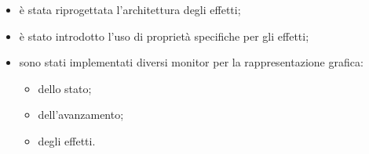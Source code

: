 \documentclass[%
]{beamer}
\begin{document}
            \begin{frame}
                \frametitle{\insertsection}
                \framesubtitle{\insertsubsection}
                \begin{columns}[onlytextwidth]
                    \begin{column}{.4\textwidth}
                    \begin{itemize}
                        \item<1->
                            è stata riprogettata l'architettura degli effetti;
                        \item<2->
                            è stato introdotto l'uso di proprietà specifiche per gli effetti;
                        \item<3->
                            sono stati implementati diversi monitor per la rappresentazione grafica:
                            \begin{itemize}
                              \item<4->
                                  dello stato;
                              \item<5->
                                  dell'avanzamento;
                              \item<6->
                                  degli effetti.
                            \end{itemize}
                    \end{itemize}
                    \end{column}
                    \begin{column}{.6\textwidth}
                        \centering

\end{column}
\end{columns}
\end{frame}
\end{document}
